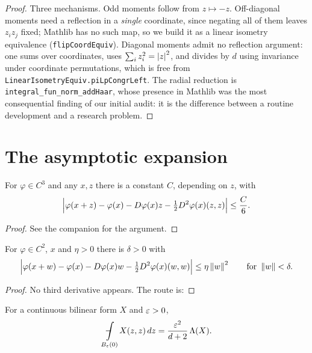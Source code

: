 \begin{proof}
\leanok
Three mechanisms. Odd moments follow from $z \mapsto -z$. Off-diagonal moments
need a reflection in a \emph{single} coordinate, since negating all of them
leaves $z_i z_j$ fixed; Mathlib has no such map, so we build it as a linear
isometry equivalence (\texttt{flipCoordEquiv}). Diagonal moments admit no
reflection argument: one sums over coordinates, uses
$\sum_i z_i^2 = \left\lvert z\right\rvert^2$, and divides by $d$ using invariance under
coordinate permutations, which is free from
\texttt{LinearIsometryEquiv.piLpCongrLeft}. The radial reduction is
\texttt{integral\_fun\_norm\_addHaar}, whose presence in Mathlib was the most
consequential finding of our initial audit: it is the difference between a
routine development and a research problem.
\end{proof}


\chapter{The asymptotic expansion}

\begin{theorem}\label{thm:taylor}
\leanok
For $\varphi \in C^3$ and any $x, z$ there is a constant $C$, depending on $z$,
with
\[
  \Bigl\lvert \varphi(x+z) - \varphi(x) - D\varphi(x)z
    - \tfrac12 D^2\varphi(x)(z,z) \Bigr\rvert \le \frac{C}{6} .
\]
\end{theorem}

\begin{proof}
\leanok
See the companion for the argument.
\end{proof}


\begin{theorem}\label{thm:ctwo}
\leanok
For $\varphi \in C^2$, $x$ and $\eta > 0$ there is $\delta > 0$ with
\[
  \Bigl\lvert \varphi(x+w) - \varphi(x) - D\varphi(x)w
    - \tfrac12 D^2\varphi(x)(w,w) \Bigr\rvert \le \eta \left\lVert w\right\rVert^2
  \qquad\text{for } \left\lVert w\right\rVert < \delta .
\]
\end{theorem}

\begin{proof}
\leanok
{}
No third derivative appears. The route is:
\end{proof}


\begin{theorem}\label{thm:quadavg}
\leanok
For a continuous bilinear form $X$ and $\varepsilon > 0$,
\[
  \avgint_{B_\eps(0)} X(z,z)\,dz = \frac{\eps^2}{d+2}\,\Lambda(X) .
\]
\end{theorem}

